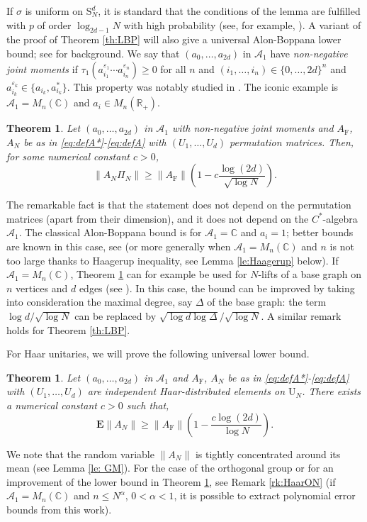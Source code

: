 \documentclass[11pt]{article}
\renewcommand{\star}{{\mathrm{F}}}
\newtheorem{theorem}[lemma]{Theorem}
\newcommand{\cA}{\mathcal{A}}
\newcommand{\dE}{\mathbf {E}}
\newcommand{\dU}{\mathrm {U}}
\newcommand{\dS}{\mathrm{S}}
\newcommand{\dR}{\mathbb {R}}
\newcommand{\dC}{\mathbb {C}}
\newcommand{\PAR}[1]{{{\left(#1\right)}}} %
\newcommand{\1}{1\!\!{\sf I}}
\newcommand{\veps}{\varepsilon}
\begin{document}
If $\sigma$ is uniform on $\dS_N^d$, it is standard that the conditions of the lemma are fulfilled with $p$ of order $\log_{2d-1} N$ with high probability (see, for example, \cite[Lemma 23]{MR4024563}).  A variant of the proof of Theorem \ref{th:LBP} will also give a universal Alon-Boppana lower bound; see \cite{MR1124768,MR1978881} for background. We say that $(a_0,\ldots,a_{2d})$ in $\cA_1$ have {\em non-negative joint moments}  if $\tau_1 ( a^{\veps_1}_{i_1}\cdots a^{\veps_n}_{i_n} ) \geq 0$ for all $n$ and $(i_1,\ldots,i_n) \in \{0,\ldots,2d \}^n$ and $a_{i_k}^{\veps_k} \in \{a_{i_k},a_{i_k}^*\}$. This property was notably studied in \cite{lehnerthesis}. The iconic example is $\cA_1 = M_n(\dC)$ and $a_i \in M_n (\dR_+)$. 


\begin{theorem}\label{th:AB}
Let $(a_0,\ldots,a_{2d})$ in $\cA_1$ with non-negative joint moments and $A_\star$, $A_N$ be as in \eqref{eq:defA*}-\eqref{eq:defA} with  $(U_1,\ldots, U_d)$ permutation matrices. Then, for some numerical constant $c >0$,
$$
\| A_N \Pi_N \| \geq \| A_\star \| \PAR{ 1- c \frac{ \log (2d) }{\sqrt{\log N}} }.
$$
\end{theorem}

The remarkable fact is that the statement does not depend on the permutation matrices (apart from their dimension), and it does not depend on the $C^*$-algebra $\cA_1$. The classical Alon-Boppana bound is for $\cA_1 = \dC$ and $a_i = 1$; better bounds are known in this case, see \cite{MR2679612} (or more generally when $\cA_1 = M_n(\dC)$ and $n$ is not too large thanks to Haagerup inequality, see Lemma \ref{le:Haagerup} below). If $\cA_{1} = M_n(\dC)$, Theorem \ref{th:AB} can for example be used for $N$-lifts of a base graph on $n$ vertices and $d$ edges (see \cite{MR1883559,MR1978881,MR4024563}). In this case, the bound can be improved by taking into consideration the maximal degree, say $\Delta$ of the base graph: the term $\log d / \sqrt{\log N}$ can be replaced by  $\sqrt{  \log d \log \Delta} / \sqrt{\log N}$. A similar remark holds for Theorem \ref{th:LBP}.


For Haar unitaries, we will prove the following universal lower bound. 

\begin{theorem}\label{th:LBU1}
Let   $(a_0,\ldots,a_{2d})$ in $\cA_1$ and $A_\star$, $A_N$ be as in \eqref{eq:defA*}-\eqref{eq:defA} with  $(U_1,\ldots, U_d)$ are independent Haar-distributed elements on $\dU_N$. There exists a numerical constant $c >0$ such that, 
$$
\dE \| A_N \| \geq \|A_\star\|  \PAR{ 1 -  \frac{c  \log (2d)}{\log N}}.
$$
\end{theorem}
We note that the random variable $\| A_N \|$ is tightly concentrated around its mean (see Lemma \ref{le: GM}). For the case of the orthogonal group or for an improvement of the lower bound in Theorem \ref{th:LBU1}, see Remark \ref{rk:HaarON} (if $\cA_1 = M_n(\dC)$ and $n \leq N^{\alpha}$, $0 < \alpha < 1$, it is possible to extract polynomial error bounds from this work). 
\end{document}
